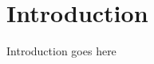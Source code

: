 \documentclass[\rootfolder/main.tex]{subfiles}
\begin{document}
\chapter{Introduction} %

\label{ch:introduction} %

Introduction goes here
\end{document}
